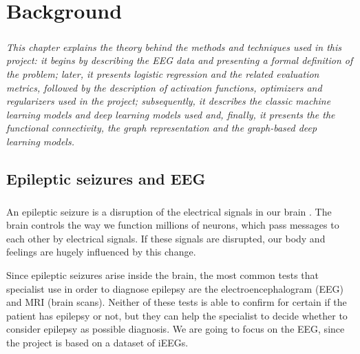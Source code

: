 
\chapter{Background} \label{chap: background}

\paragraph{} \textit{This chapter explains the theory behind the methods and techniques used in this project: it begins by describing the EEG data and presenting a formal definition of the problem; later, it presents logistic regression and the related evaluation metrics, followed by the description of activation functions, optimizers and regularizers used in the project; subsequently, it describes the classic machine learning models and deep learning models used and, finally, it presents the the functional connectivity, the graph representation and the graph-based deep learning models.}

\section{Epileptic seizures and EEG} \label{sec: epileptic_seizures_and_eeg}
\paragraph{} An epileptic seizure is a disruption of the electrical signals in our brain \cite{EpilepsySociety:aboutepilepsy}. The brain controls the way we function millions of neurons, which pass messages to each other by electrical signals. If these signals are disrupted, our body and feelings are hugely influenced by this change.

Since epileptic seizures arise inside the brain, the most common tests that specialist use in order to diagnose epilepsy are the electroencephalogram (EEG) and MRI (brain scans). Neither of these tests is able to confirm for certain if the patient has epilepsy or not, but they can help the specialist to decide whether to consider epilepsy as possible diagnosis. We are going to focus on the EEG, since the project is based on a dataset of iEEGs.

